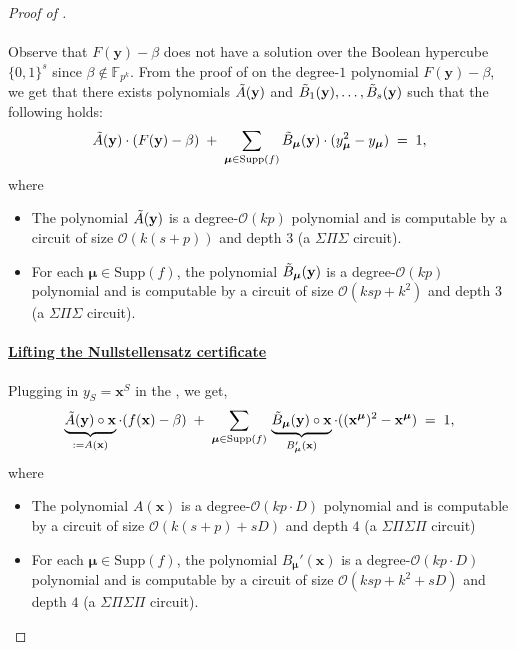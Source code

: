 \documentclass[11pt]{article}
\newcommand{\Boo}{\{0,1 \}}
\newcommand{\bigO}{\mathcal{O}}
\newcommand{\F}{\mathbb{F}}
\begin{document}
\begin{proof}[Proof of ]
\paragraph{}Observe that $F(\mathbf{y}) - \beta$ does not have a solution over the Boolean hypercube $\Boo^{s}$ since $\beta \notin \F_{p^{k}}$. From the proof of  on the degree-$1$ polynomial $F(\mathbf{y}) - \beta$, we get that there exists polynomials $\Tilde{A}(\mathbf{y})$ and $\Tilde{B}_{1}(\mathbf{y}), \ldots, \Tilde{B}_{s}(\mathbf{y})$ such that the following holds:
\begin{equation}\label{eqn:ubd-sparse-constant-depth}
    \Tilde{A}(\mathbf{y}) \cdot (F(\mathbf{y}) - \beta) \; + \; \sum_{\bm{\mu} \in \mathrm{Supp}(f)} \Tilde{B}_{\bm{\mu}}(\mathbf{y}) \cdot (y_{\bm{\mu}}^{2} - y_{\bm{\mu}}) \; = \; 1,
\end{equation}
where
\begin{itemize}
    \item The polynomial $\Tilde{A}(\mathbf{y})$ is a degree-$\bigO(kp)$ polynomial and is computable by a circuit of size $\bigO(k(s+p))$ and depth $3$ (a $\Sigma \Pi \Sigma$ circuit).
    \item For each $\bm{\mu} \in \mathrm{Supp}(f)$, the polynomial $\Tilde{B}_{\bm{\mu}}(\mathbf{y})$ is a degree-$\bigO(kp)$ polynomial and is computable by a circuit of size $\bigO(ksp + k^{2})$ and depth $3$ (a $\Sigma \Pi \Sigma$ circuit).
\end{itemize}


\paragraph{\underline{Lifting the Nullstellensatz certificate}}Plugging in $y_{S} = \mathbf{x}^{S}$ in the , we get,
\begin{equation}\label{eqn:ubd-sparse-lifted-cert}
    \underbrace{\Tilde{A}(\mathbf{y}) \circ \mathbf{x}}_{:= A(\mathbf{x})} \cdot (f(\mathbf{x}) - \beta) \; + \; \sum_{\bm{\mu} \in \mathrm{Supp}(f)} \, \underbrace{\Tilde{B}_{\bm{\mu}}(\mathbf{y}) \circ \mathbf{x}}_{B_{\bm{\mu}}'(\mathbf{x})} \cdot ((\mathbf{x}^{\bm{\mu}})^{2} - \mathbf{x}^{\bm{\mu}}) \; = \; 1,
\end{equation}
where
\begin{itemize}
    \item The polynomial $A(\mathbf{x})$ is a degree-$\bigO(kp \cdot D)$ polynomial and is computable by a circuit of size $\bigO(k (s+p) + sD)$ and depth $4$ (a $\Sigma \Pi \Sigma \Pi$ circuit)
    \item For each $\bm{\mu} \in \mathrm{Supp}(f)$, the polynomial $B_{\bm{\mu}}'(\mathbf{x})$ is a degree-$\bigO(k p \cdot D)$ polynomial and is computable by a circuit of size $\bigO(k sp + k^{2} + s D)$ and depth $4$ (a $\Sigma \Pi \Sigma \Pi$ circuit).
\end{itemize}


\end{proof}
\end{document}

